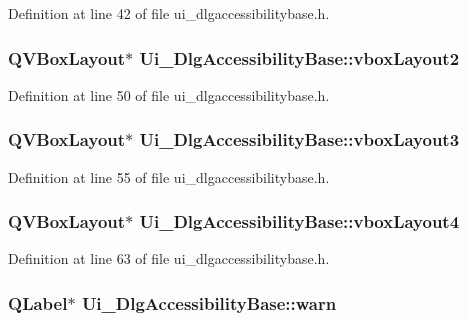 Definition at line 42 of file ui\+\_\+dlgaccessibilitybase.\+h.

\hypertarget{classUi__DlgAccessibilityBase_ac46065b12dbcbd56e25c4af9b2bed638}{
\subsubsection[{vbox\+Layout2}]{\setlength{\rightskip}{0pt plus 5cm}Q\+V\+Box\+Layout$\ast$ Ui\+\_\+\+Dlg\+Accessibility\+Base\+::vbox\+Layout2}}\label{classUi__DlgAccessibilityBase_ac46065b12dbcbd56e25c4af9b2bed638}


Definition at line 50 of file ui\+\_\+dlgaccessibilitybase.\+h.

\hypertarget{classUi__DlgAccessibilityBase_ada0b3cf9426af07f6a737df4a9d26e5d}{
\subsubsection[{vbox\+Layout3}]{\setlength{\rightskip}{0pt plus 5cm}Q\+V\+Box\+Layout$\ast$ Ui\+\_\+\+Dlg\+Accessibility\+Base\+::vbox\+Layout3}}\label{classUi__DlgAccessibilityBase_ada0b3cf9426af07f6a737df4a9d26e5d}


Definition at line 55 of file ui\+\_\+dlgaccessibilitybase.\+h.

\hypertarget{classUi__DlgAccessibilityBase_ae920274bca545ba85ff1578ed4317d56}{
\subsubsection[{vbox\+Layout4}]{\setlength{\rightskip}{0pt plus 5cm}Q\+V\+Box\+Layout$\ast$ Ui\+\_\+\+Dlg\+Accessibility\+Base\+::vbox\+Layout4}}\label{classUi__DlgAccessibilityBase_ae920274bca545ba85ff1578ed4317d56}


Definition at line 63 of file ui\+\_\+dlgaccessibilitybase.\+h.

\hypertarget{classUi__DlgAccessibilityBase_ad66df65b95e80cd067b2e387ca0052b2}{
\subsubsection[{warn}]{\setlength{\rightskip}{0pt plus 5cm}Q\+Label$\ast$ Ui\+\_\+\+Dlg\+Accessibility\+Base\+::warn}}\label{classUi__DlgAccessibilityBase_ad66df65b95e80cd067b2e387ca0052b2}


